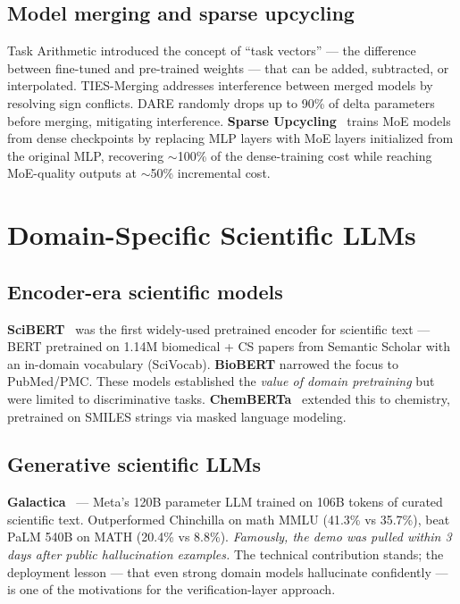 \documentclass[11pt]{article}
\begin{document}
\subsection{Model merging and sparse upcycling}

Task Arithmetic introduced the concept of ``task vectors'' --- the difference between fine-tuned and pre-trained weights --- that can be added, subtracted, or interpolated. TIES-Merging addresses interference between merged models by resolving sign conflicts. DARE randomly drops up to 90\% of delta parameters before merging, mitigating interference. \textbf{Sparse Upcycling}~\cite{komatsuzaki2022sparseupcycling} trains MoE models from dense checkpoints by replacing MLP layers with MoE layers initialized from the original MLP, recovering $\sim$100\% of the dense-training cost while reaching MoE-quality outputs at $\sim$50\% incremental cost.

\section{Domain-Specific Scientific LLMs}

\subsection{Encoder-era scientific models}

\textbf{SciBERT}~\cite{beltagy2019scibert} was the first widely-used pretrained encoder for scientific text --- BERT pretrained on 1.14M biomedical + CS papers from Semantic Scholar with an in-domain vocabulary (SciVocab). \textbf{BioBERT} narrowed the focus to PubMed/PMC. These models established the \emph{value of domain pretraining} but were limited to discriminative tasks. \textbf{ChemBERTa}~\cite{chithrananda2020chemberta} extended this to chemistry, pretrained on SMILES strings via masked language modeling.

\subsection{Generative scientific LLMs}

\textbf{Galactica}~\cite{taylor2022galactica} --- Meta's 120B parameter LLM trained on 106B tokens of curated scientific text. Outperformed Chinchilla on math MMLU (41.3\% vs 35.7\%), beat PaLM 540B on MATH (20.4\% vs 8.8\%). \emph{Famously, the demo was pulled within 3 days after public hallucination examples.} The technical contribution stands; the deployment lesson --- that even strong domain models hallucinate confidently --- is one of the motivations for the verification-layer approach.
\end{document}

